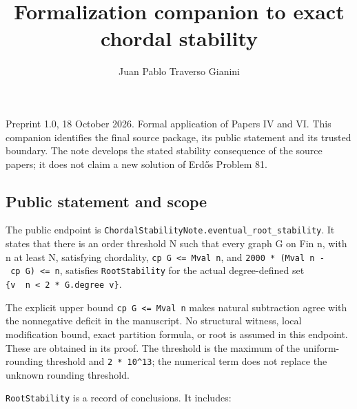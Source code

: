 \documentclass[english,11pt,a4paper]{article}
\title{Formalization companion to exact chordal stability}
\author{Juan Pablo Traverso Gianini}
\date{}
\begin{document}
\raggedbottom\maketitle
Preprint 1.0, 18 October 2026. Formal application of Papers IV and VI.
This companion identifies the final source package, its public statement
and its trusted boundary. The note develops the stated stability
consequence of the source papers; it does not claim a new solution of
Erdős Problem 81.

\subsection{Public statement and
scope}\label{public-statement-and-scope}

The public endpoint is
\nolinkurl{ChordalStabilityNote.eventual_root_stability}. It states that
there is an order threshold N such that every graph G on Fin n, with n
at least N, satisfying chordality,
\texttt{cp\ G\ \textless{}=\ Mval\ n}, and
\texttt{2000\ *\ (Mval\ n\ -\ cp\ G)\ \textless{}=\ n}, satisfies
\nolinkurl{RootStability} for the actual degree-defined set
\texttt{\{v\ \textbar{}\ n\ \textless{}\ 2\ *\ G.degree\ v\}}.

The explicit upper bound \texttt{cp\ G\ \textless{}=\ Mval\ n} makes
natural subtraction agree with the nonnegative deficit in the
manuscript. No structural witness, local modification bound, exact
partition formula, or root is assumed in this endpoint. These are
obtained in its proof. The threshold is the maximum of the
uniform-rounding threshold and \texttt{2\ *\ 10\^{}13}; the numerical
term does not replace the unknown rounding threshold.

\nolinkurl{RootStability} is a record of conclusions. It includes:
\end{document}
